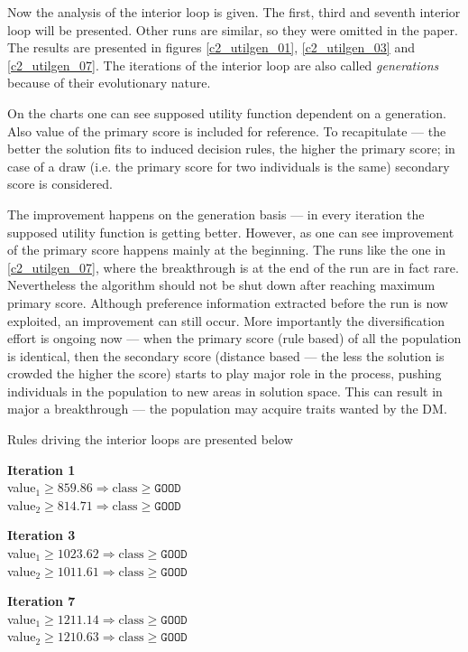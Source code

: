 Now the analysis of the interior loop is given. The first, third and seventh
interior loop will be presented. Other runs are similar, so they were omitted
in the paper. The results are presented in figures \ref{c2_utilgen_01},
\ref{c2_utilgen_03} and \ref{c2_utilgen_07}. The iterations of the interior
loop are also called \textit{generations} because of their evolutionary
nature.

On the charts one can see supposed utility function dependent on a
generation. Also value of the primary score is included for reference. To
recapitulate --- the better the solution fits to induced decision rules, the
higher the primary score; in case of a draw (i.e. the primary score for two
individuals is the same) secondary score is considered.

The improvement happens on the generation basis --- in every iteration the
supposed utility function is getting better. However, as one can see
improvement of the primary score happens mainly at the beginning. The runs
like the one in \ref{c2_utilgen_07}, where the breakthrough is at the end of
the run are in fact rare. Nevertheless the algorithm should not be shut down
after reaching maximum primary score. Although preference information
extracted before the run is now exploited, an improvement can still
occur. More importantly the diversification effort is ongoing now --- when the
primary score (rule based) of all the population is identical, then the
secondary score (distance based --- the less the solution is crowded the
higher the score) starts to play major role in the process, pushing
individuals in the population to new areas in solution space. This can result
in major a breakthrough --- the population may acquire traits wanted by the
DM.

Rules driving the interior loops are presented below

\begin{description}
  \item{\textbf{Iteration 1}} \\
    value$_1 \ge 859.86 \Rightarrow \text{class} \ge \texttt{GOOD}$ \\
    value$_2 \ge 814.71 \Rightarrow \text{class} \ge \texttt{GOOD}$
  \item{\textbf{Iteration 3}} \\
    value$_1 \ge 1023.62 \Rightarrow \text{class} \ge \texttt{GOOD}$ \\
    value$_2 \ge 1011.61 \Rightarrow \text{class} \ge \texttt{GOOD}$
  \item{\textbf{Iteration 7}} \\
    value$_1 \ge 1211.14 \Rightarrow \text{class} \ge \texttt{GOOD}$ \\
    value$_2 \ge 1210.63 \Rightarrow \text{class} \ge \texttt{GOOD}$
\end{description}

